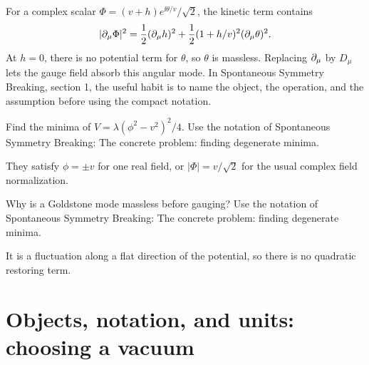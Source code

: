 \begin{example}
For a complex scalar \(\Phi=(v+h)e^{\ii\theta/v}/\sqrt2\), the kinetic term contains
\[
  |\partial_\mu\Phi|^2=\frac12(\partial_\mu h)^2+\frac12(1+h/v)^2(\partial_\mu\theta)^2.
\]
At \(h=0\), there is no potential term for \(\theta\), so \(\theta\) is massless.  Replacing \(\partial_\mu\) by \(D_\mu\) lets the gauge field absorb this angular mode.  In Spontaneous Symmetry Breaking, section 1, the useful habit is to name the object, the operation, and the assumption before using the compact notation.
\end{example}



\begin{exercise}
Find the minima of \(V=\lambda(\phi^2-v^2)^2/4\).  Use the notation of Spontaneous Symmetry Breaking: The concrete problem: finding degenerate minima.
\begin{answer}
They satisfy \(\phi=\pm v\) for one real field, or \(|\Phi|=v/\sqrt2\) for the usual complex field normalization.
\end{answer}
\end{exercise}

\begin{exercise}
Why is a Goldstone mode massless before gauging?  Use the notation of Spontaneous Symmetry Breaking: The concrete problem: finding degenerate minima.
\begin{answer}
It is a fluctuation along a flat direction of the potential, so there is no quadratic restoring term.
\end{answer}
\end{exercise}



\section{Objects, notation, and units: choosing a vacuum}













